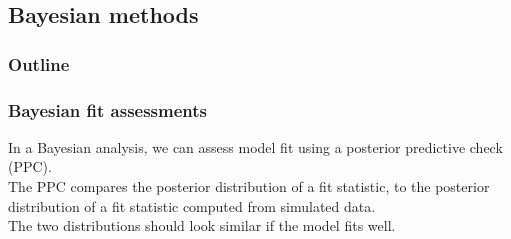 \documentclass[color=usenames,dvipsnames]{beamer}\usepackage[]{graphicx}\usepackage[]{color}
\begin{document}












\subsection{Bayesian methods}



\begin{frame}[plain]
  \frametitle{Outline}
  \Large
\end{frame}




\begin{frame}[fragile]
  \frametitle{Bayesian fit assessments}
  In a Bayesian analysis, we can assess model fit using a
  \alert{posterior predictive check} (PPC). \\
  \pause
  \vfill
  The PPC compares the posterior distribution of a fit statistic, to
  the posterior distribution of a fit statistic computed from
  simulated data. \\ 
  \pause
  \vfill
  The two distributions should look similar if the model fits well. \\
\end{frame}
\end{document}
